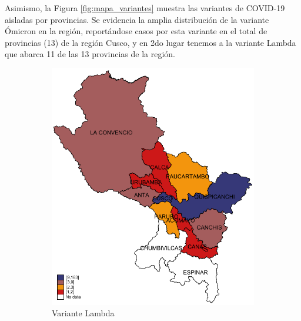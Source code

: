 \documentclass[12pt,a4paper,openany]{book}
\begin{document}
	Asimismo, la Figura \ref{fig:mapa_variantes} muestra las variantes de COVID-19 aisladas por provincias. Se evidencia la amplia distribución de la variante Ómicron en la región, reportándose casos por esta variante en el total de provincias (13) de la región Cusco, y en 2do lugar tenemos a la variante Lambda que abarca 11 de las 13 provincias de la región.
	
	\begin{figure}[h]
		\caption{Distribución provincial de las variantes de SARS-CoV-2 aisladas en la Región Cusco hasta la SE 51-2022.}
		\label{fig:mapa_variantes}
		\centering
		\begin{subfigure}[b]{0.40\textwidth}
			\centering
			\includegraphics[width=\textwidth]{../figuras/variantes_provincial_lambda.pdf}
			\caption{Variante Lambda}
		\end{subfigure}
		\hfill
		\begin{subfigure}[b]{0.40\textwidth}
			\centering

\end{subfigure}
\end{figure}
\end{document}
